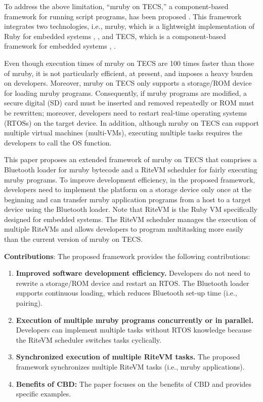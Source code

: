 \documentclass[S,R,E]{article/compsoft}
\begin{document}
To address the above limitation, ``mruby on TECS,'' a component-based framework for running script programs, has been proposed \cite{par:mrubyonTECS}.
This framework integrates two technologies, i.e., mruby, which is a lightweight implementation of Ruby for embedded systems \cite{par:mruby}, \cite{url:mruby}, and TECS, which is a component-based framework for embedded systems \cite{par:TECS}, \cite{url:TOPPERS}.

Even though execution times of mruby on TECS are 100 times faster than those of mruby, it is not particularly efficient, at present, and imposes a heavy burden on developers.
Moreover, mruby on TECS only supports a storage/ROM device for loading mruby programs.
Consequently, if mruby programs are modified, a secure digital (SD) card must be inserted and removed repeatedly or ROM must be rewritten; moreover, developers need to restart real-time operating systems (RTOSs) on the target device.
In addition, although mruby on TECS can support multiple virtual machines (multi-VMs), executing multiple tasks requires the developers to call the OS function.

This paper proposes an extended framework of mruby on TECS that comprises a Bluetooth loader for mruby bytecode and a RiteVM scheduler for fairly executing mruby programs.
To improve development efficiency, in the proposed framework, developers need to implement the platform on a storage device only once at the beginning and can transfer mruby application programs from a host to a target device using the Bluetooth loader.
Note that RiteVM is the Ruby VM specifically designed for embedded systems.
The RiteVM scheduler manages the execution of multiple RiteVMs and allows developers to program multitasking more easily than the current version of mruby on TECS.

{\bf Contributions}: The proposed framework provides the following contributions:
\begin{enumerate}
\item {\bf Improved software development efficiency.}
Developers do not need to rewrite a storage/ROM device and restart an RTOS.
The Bluetooth loader supports continuous loading, which reduces Bluetooth set-up time (i.e., pairing).
\item {\bf Execution of multiple mruby programs concurrently or in parallel.}
Developers can implement multiple tasks without RTOS knowledge because the RiteVM scheduler switches tasks cyclically.
\item {\bf Synchronized execution of multiple RiteVM tasks.}
The proposed framework synchronizes multiple RiteVM tasks (i.e., mruby applications).
\item {\bf Benefits of CBD:}
The paper focuses on the benefits of CBD and provides specific examples.
\end{enumerate}
\end{document}
